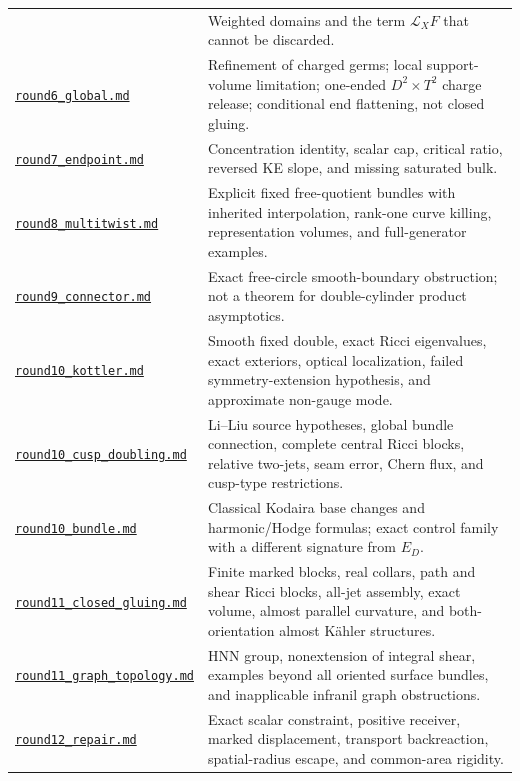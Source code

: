 \documentclass[a4paper,11pt]{article}
\theoremstyle{definition}
\begin{document}
\begin{longtable}{L{.34\textwidth}L{.59\textwidth}}
& Weighted domains and the term $\mathcal L_XF$ that cannot be discarded.\\
\href{../references/rounds/round6_global.md}{\nolinkurl{round6_global.md}}
& Refinement of charged germs; local support-volume limitation; one-ended $D^2\times T^2$ charge release; conditional end flattening, not closed gluing.\\
\href{../references/rounds/round7_endpoint.md}{\nolinkurl{round7_endpoint.md}}
& Concentration identity, scalar cap, critical ratio, reversed KE slope, and missing saturated bulk.\\
\href{../references/rounds/round8_multitwist.md}{\nolinkurl{round8_multitwist.md}}
& Explicit fixed free-quotient bundles with inherited interpolation, rank-one curve killing, representation volumes, and full-generator examples.\\
\href{../references/rounds/round9_connector.md}{\nolinkurl{round9_connector.md}}
& Exact free-circle smooth-boundary obstruction; not a theorem for double-cylinder product asymptotics.\\
\href{../references/rounds/round10_kottler.md}{\nolinkurl{round10_kottler.md}}
& Smooth fixed double, exact Ricci eigenvalues, exact exteriors, optical localization, failed symmetry-extension hypothesis, and approximate non-gauge mode.\\
\href{../references/rounds/round10_cusp_doubling.md}{\nolinkurl{round10_cusp_doubling.md}}
& Li--Liu source hypotheses, global bundle connection, complete central Ricci blocks, relative two-jets, seam error, Chern flux, and cusp-type restrictions.\\
\href{../references/rounds/round10_bundle.md}{\nolinkurl{round10_bundle.md}}
& Classical Kodaira base changes and harmonic/Hodge formulas; exact control family with a different signature from $E_D$.\\
\href{../references/rounds/round11_closed_gluing.md}{\nolinkurl{round11_closed_gluing.md}}
& Finite marked blocks, real collars, path and shear Ricci blocks, all-jet assembly, exact volume, almost parallel curvature, and both-orientation almost K\"ahler structures.\\
\href{../references/rounds/round11_graph_topology.md}{\nolinkurl{round11_graph_topology.md}}
& HNN group, nonextension of integral shear, examples beyond all oriented surface bundles, and inapplicable infranil graph obstructions.\\
\href{../references/rounds/round12_repair.md}{\nolinkurl{round12_repair.md}}
& Exact scalar constraint, positive receiver, marked displacement, transport backreaction, spatial-radius escape, and common-area rigidity.\\

\end{longtable}
\end{document}

